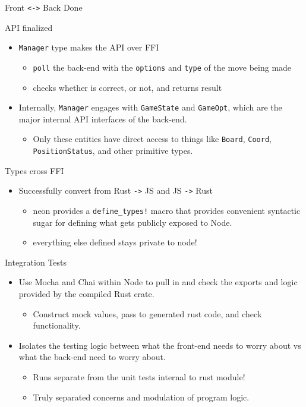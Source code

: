 \documentclass[allowframebreaks]{beamer}
\begin{document}
\begin{frame}[fragile,allowframebreaks, label=]{Front \texttt{<->} Back Done}
 \begin{block}{API finalized}
\begin{itemize}
\item \texttt{Manager} type makes the API over FFI
\begin{itemize}
\item \texttt{poll} the back-end with the \texttt{options} and \texttt{type} of the move being made
\item checks whether is correct, or not, and returns result
\end{itemize}
\item Internally, \texttt{Manager} engages with \texttt{GameState} and \texttt{GameOpt}, which are the major \alert{internal} API
interfaces of the back-end.
\begin{itemize}
\item Only these entities have direct access to things like \texttt{Board}, \texttt{Coord}, \texttt{PositionStatus}, and
other primitive types.
\end{itemize}
\end{itemize}
\end{block}
\begin{block}{Types cross FFI}
\begin{itemize}
\item Successfully convert from Rust \texttt{->} JS and JS \texttt{->} Rust
\begin{itemize}
\item neon provides a \texttt{define\_types!} macro that provides convenient syntactic sugar for defining
what gets publicly exposed to Node.
\item \alert{everything else defined stays private to node!}
\end{itemize}
\end{itemize}
\end{block}
\begin{block}{Integration Tests}
\begin{itemize}
\item Use Mocha and Chai within Node to pull in and check the exports and logic provided by the
compiled Rust crate.
\begin{itemize}
\item Construct mock values, pass to generated rust code, and check functionality.
\end{itemize}
\item \alert{Isolates the testing logic} between what the front-end needs to worry about vs what the
back-end need to worry about.
\begin{itemize}
\item Runs separate from the unit tests internal to rust module!
\item Truly separated concerns and modulation of program logic.
\end{itemize}
\end{itemize}
\end{block}
\end{frame}
\end{document}
